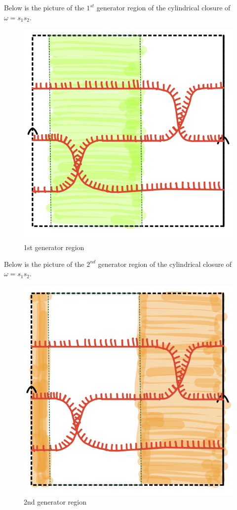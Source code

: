 Below is the picture of the $1^{st}$ generator region of the cylindrical closure of $\omega = s_1 s_2$.

\begin{figure}[H] 
    \centering
    \includegraphics[scale = 0.95]{diagrams/natural_alternating_diagrams/6-1.png}
    \caption{1st generator region}
    \label{fig:your-label}
\end{figure}

Below is the picture of the $2^{nd}$ generator region of the cylindrical closure of $\omega = s_1 s_2$.

\begin{figure}[H] 
    \centering
    \includegraphics[scale = 0.95]{diagrams/natural_alternating_diagrams/6-2.png}
    \caption{2nd generator region}
    \label{fig:your-label}
\end{figure}

